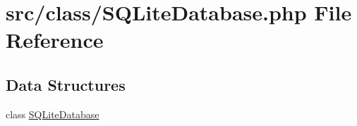 \hypertarget{_s_q_lite_database_8php}{}\section{src/class/\+S\+Q\+Lite\+Database.php File Reference}
\label{_s_q_lite_database_8php}
\subsection*{Data Structures}
\begin{DoxyCompactItemize}
\item 
class \hyperlink{class_s_q_lite_database}{S\+Q\+Lite\+Database}
\end{DoxyCompactItemize}

